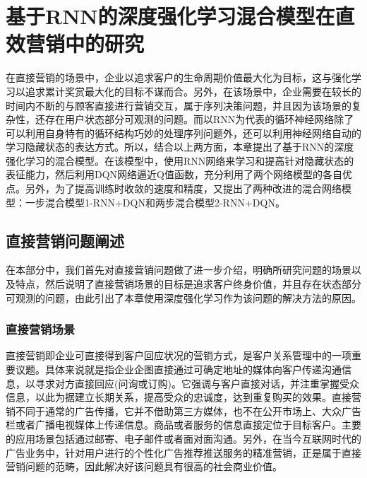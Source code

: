 \chapter{基于RNN的深度强化学习混合模型在直效营销中的研究}


在直接营销的场景中，企业以追求客户的生命周期价值最大化为目标，这与强化学习以追求累计奖赏最大化的目标不谋而合。另外，在该场景中，企业需要在较长的时间内不断的与顾客直接进行营销交互，属于序列决策问题，并且因为该场景的复杂性，还存在用户状态部分可观测的问题。而以RNN为代表的循环神经网络除了可以利用自身特有的循环结构巧妙的处理序列问题外，还可以利用神经网络自动的学习隐藏状态的表达方式。所以，结合以上两方面，本章提出了基于RNN的深度强化学习的混合模型。在该模型中，使用RNN网络来学习和提高针对隐藏状态的表征能力，然后利用DQN网络逼近Q值函数，充分利用了两个网络模型的各自优点。另外，为了提高训练时收敛的速度和精度，又提出了两种改进的混合网络模型：一步混合模型1-RNN+DQN和两步混合模型2-RNN+DQN。

\section{直接营销问题阐述}
在本部分中，我们首先对直接营销问题做了进一步介绍，明确所研究问题的场景以及特点，然后说明了直接营销场景的目标是追求客户终身价值，并且存在状态部分可观测的问题，由此引出了本章使用深度强化学习作为该问题的解决方法的原因。

\subsection{直接营销场景}
直接营销即企业可直接得到客户回应状况的营销方式，是客户关系管理中的一项重要议题。具体来说就是指企业企图直接通过可确定地址的媒体向客户传递沟通信息，以寻求对方直接回应(问询或订购)。它强调与客户直接对话，并注重掌握受众信息，以此为据建立长期关系，提高受众的忠诚度，达到重复购买的效果。直接营销不同于通常的广告传播，它并不借助第三方媒体，也不在公开市场上、大众广告栏或者广播电视媒体上传递信息。商品或者服务的信息直接定位于目标客户。主要的应用场景包括通过邮寄、电子邮件或者面对面沟通。另外，在当今互联网时代的广告业务中，针对用户进行的个性化广告推荐推送服务的精准营销，正是属于直接营销问题的范畴，因此解决好该问题具有很高的社会商业价值。

